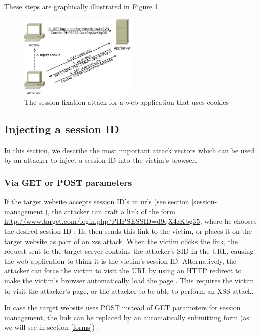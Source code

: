 These steps are graphically illustrated in Figure \ref{fig:fixation}.

\begin{figure}[htb]
	\centering
	\includegraphics[width=0.50\textwidth]{img/fixation.png}
	\caption[The session fixation attack]{The session fixation attack for a web application that uses cookies}
	\label{fig:fixation}
\end{figure}

\subsection{Injecting a session ID}\label{injecting-sid}

In this section, we describe the most important attack vectors which can be used by an attacker to inject a session ID into the victim's browser.

\subsubsection{Via GET or POST parameters}\label{get-or-post}

If the target website accepts session ID's in \glspl{url} (see section \ref{session-management}), the attacker can craft a link of the form \url{http://www.target.com/login.php?PHPSESSID=d9qX4zKbg35}, where he chooses the desired session ID \cite{Johns2011}. He then sends this link to the victim, or places it on the target website as part of an \gls{xss} attack. When the victim clicks the link, the request sent to the target server contains the attacker's SID in the URL, causing the web application to think it is the victim's session ID. Alternatively, the attacker can force the victim to visit the URL by using an HTTP redirect \cite{rfc2616} to make the victim's browser automatically load the page \cite{Shiflett2004}. This requires the victim to visit the attacker's page, or the attacker to be able to perform an XSS attack.

In case the target website uses POST instead of GET parameters for session management, the link can be replaced by an automatically submitting form (as we will see in section \ref{forms}) \cite{Kolsek2002,Bontrager2005}.

